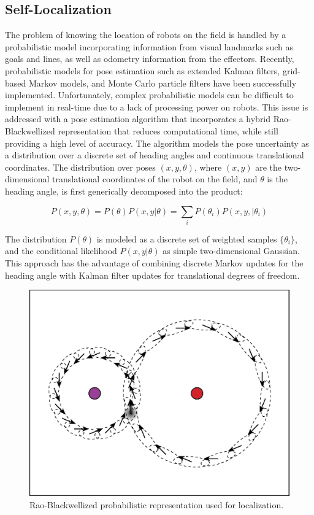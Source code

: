 \documentclass{article}
\begin{document}
\subsection{Self-Localization}
	The problem of knowing the location of robots on the field is handled by a probabilistic model incorporating information from visual landmarks such as goals and lines, as well as odometry information from the effectors. Recently, probabilistic models for pose estimation such as extended Kalman filters, grid-based Markov models, and Monte Carlo particle filters have been successfully implemented. Unfortunately, complex probabilistic models can be difficult to implement in real-time due to a lack of processing power on robots. This issue is addressed with a pose estimation algorithm that incorporates a hybrid Rao-Blackwellized representation that reduces computational time, while still providing a high level of accuracy. The algorithm models the pose uncertainty as a distribution over a discrete set of heading angles and continuous translational coordinates. The distribution over poses \((x,y,\theta)\), where \((x,y)\) are the two-dimensional translational coordinates of the robot on the field, and $\theta$ is the heading angle, is first generically decomposed into the product:

	\begin{equation}
		P(x,y,\theta) = P(\theta)P(x,y|\theta) = \sum\limits_{i} P(\theta_{i})P(x,y,|\theta_{i})
	\end{equation}

 	The distribution $P(\theta)$ is modeled as a discrete set of weighted samples $\{\theta_{i}\}$, and the conditional likelihood $P(x,y|\theta)$ as simple two-dimensional Gaussian. This approach has the advantage of combining discrete Markov updates for the heading angle with Kalman filter updates for translational degrees of freedom.

	\begin{figure}[H]
		\centering
		\includegraphics[width=.6\textwidth]{figures/RaoBlackwell.eps}
		\caption{Rao-Blackwellized probabilistic representation used for localization.}
		\label{fig:raoblack}
	\end{figure}
 
\end{document}
